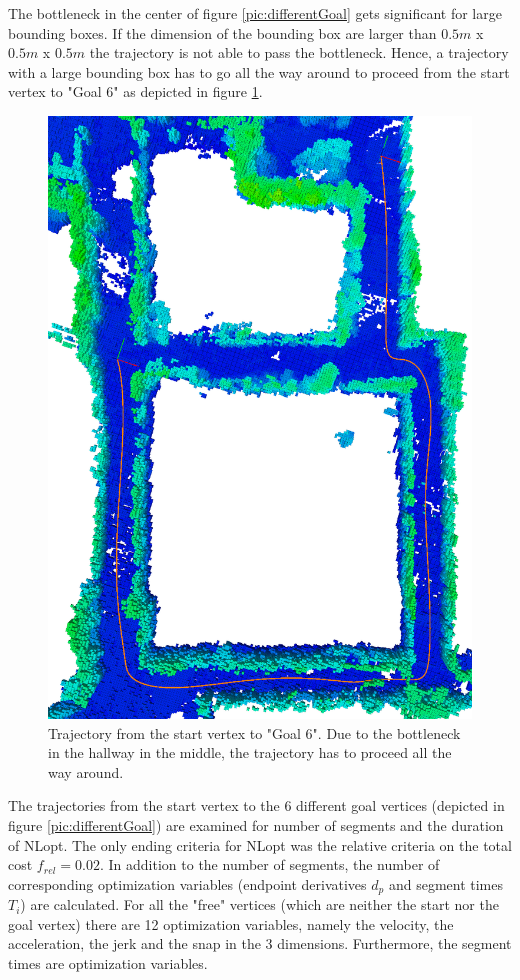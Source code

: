 The bottleneck in the center of figure \ref{pic:differentGoal} gets significant for large bounding boxes. If the dimension of the bounding box are larger than $0.5m$ x $0.5m$ x $0.5m$ the trajectory is not able to pass the bottleneck. Hence, a trajectory with a large bounding box has to go all the way around to proceed from the start vertex to "Goal 6" as depicted in figure \ref{pic:Goal6}.


\begin{figure}[H]
   \centering
   \includegraphics[angle=90,trim = 20mm 0mm 0mm 0mm,clip, width=1\textwidth]{pics/MapNlopt.png}
   \caption{Trajectory from the start vertex to "Goal 6". Due to the bottleneck in the hallway in the middle, the trajectory has to proceed all the way around.}
   \label{pic:Goal6}
\end{figure}

The trajectories from the start vertex to the 6 different goal vertices (depicted in figure \ref{pic:differentGoal}) are examined for number of segments and the duration of NLopt. The only ending criteria for NLopt was the relative criteria on the total cost $f_{rel} = 0.02$. 
In addition to the number of segments, the number of corresponding optimization variables (endpoint derivatives $d_p$ and segment times $T_i$) are calculated. For all the "free" vertices (which are neither the start nor the goal vertex) there are 12 optimization variables, namely the velocity, the acceleration, the jerk and the snap in the 3 dimensions. Furthermore, the segment times are optimization variables. \newline

